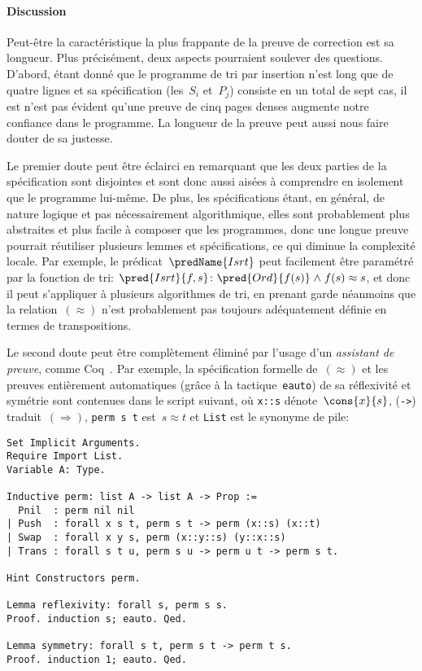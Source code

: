 \paragraph{Discussion}

Peut-être la caractéristique la plus frappante de la preuve de
correction est sa longueur. Plus précisément, deux aspects pourraient
soulever des questions. D'abord, étant donné que le programme de tri
par insertion n'est long que de quatre lignes et sa spécification
(les~\(S_i\) et~\(P_j\)) consiste en un total de sept cas, il est
n'est pas évident qu'une preuve de cinq pages denses augmente notre
confiance dans le programme. La longueur de la preuve peut aussi nous
faire douter de sa justesse.

Le premier doute peut être éclairci en remarquant que les deux parties
de la spécification sont disjointes et sont donc aussi aisées à
comprendre en isolement que le programme lui-même. De plus, les
spécifications étant, en général, de nature logique et pas
nécessairement algorithmique, elles sont probablement plus abstraites
et plus facile à composer que les programmes, donc une longue preuve
pourrait réutiliser plusieurs lemmes et spécifications, ce qui diminue
la complexité locale. Par exemple, le prédicat~\(\predName{Isrt}\)
peut facilement être paramétré par la fonction de tri:
\(\pred{Isrt}{f,s} \colon \pred{Ord}{f(s)} \mathrel{\wedge} f(s)
\approx s\), et
donc il peut s'appliquer à plusieurs algorithmes de tri, en prenant
garde néanmoins que la relation~\((\approx)\) n'est probablement pas
toujours adéquatement définie en termes de transpositions.

Le second doute peut être complètement éliminé par l'usage d'un
\emph{assistant de preuve}, comme
\textsf{Coq}~\citep{BertotCasteran_2004}. Par exemple, la
spécification formelle de~\((\approx)\) et les preuves entièrement
automatiques (grâce à la tactique~\texttt{eauto}) de sa réflexivité et
symétrie sont contenues dans le script suivant, où \verb|x::s|
dénote~\(\cons{x}{s}\), (\verb|->|) traduit~\((\Rightarrow)\),
\verb|perm s t| est~\(s \approx t\) et \verb|List| est le synonyme de
pile:
\begin{verbatim}
Set Implicit Arguments.
Require Import List.
Variable A: Type.

Inductive perm: list A -> list A -> Prop :=
  Pnil  : perm nil nil
| Push  : forall x s t, perm s t -> perm (x::s) (x::t)
| Swap  : forall x y s, perm (x::y::s) (y::x::s)
| Trans : forall s t u, perm s u -> perm u t -> perm s t.

Hint Constructors perm.

Lemma reflexivity: forall s, perm s s.
Proof. induction s; eauto. Qed.

Lemma symmetry: forall s t, perm s t -> perm t s.
Proof. induction 1; eauto. Qed.
\end{verbatim}

